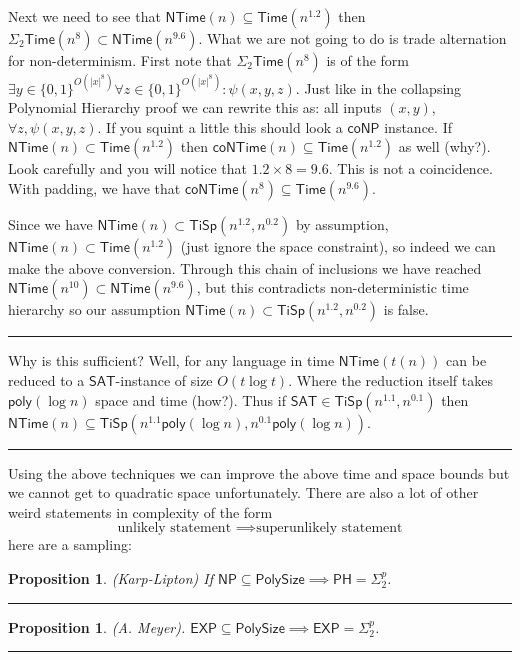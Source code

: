 \documentclass[twoside]{article}
\newtheorem{proposition}[theorem]{Proposition}
\newenvironment{proof}{{\bf Proof:}}{\hfill\rule{2mm}{2mm}}
\def\NP{\mathsf{NP}}
\def\coNP{\mathsf{coNP}}
\def\PH{\mathsf{PH}}
\def\EXP{\mathsf{EXP}}
\def\Time{\mathsf{Time}}
\def\SAT{\mathsf{SAT}}
\def\NTime{\mathsf{NTime}}
\def\TiSp{\mathsf{TiSp}}
\def\poly{\mathsf{poly}}
\def\PolySize{\mathsf{PolySize}}
\begin{document}
\begin{proof}
\begin{proof}
Next we need to see that $\NTime (n) \subseteq \Time (n^{1.2})$ then $\Sigma_2 \Time (n^8) \subset \NTime (n^{9.6})$. What we are not going to do is trade alternation for non-determinism. First note that $\Sigma_2 \Time (n^8)$ is of the form $\exists y \in \{0,1\}^{O(|x|^8)}\forall z \in \{0,1\}^{O(|x|^8)}: \psi (x,y,z)$. Just like in the collapsing Polynomial Hierarchy proof we can rewrite this as: all inputs $(x,y)$, $\forall z, \psi (x,y,z)$. If you squint a little this should look a $\coNP$ instance. If $\NTime (n) \subset \Time (n^{1.2})$ then $\mathsf{coNTime} (n) \subseteq \Time (n^{1.2})$ as well (why?). Look carefully and you will notice that $1.2 \times 8 = 9.6$. This is not a coincidence. With padding, we have that $\mathsf{coNTime} (n^8) \subseteq \Time (n^{9.6})$.  

Since we have $\NTime (n) \subset \TiSp (n^{1.2}, n^{0.2})$ by assumption, $\NTime (n) \subset \Time (n^{1.2})$ (just ignore the space constraint), so indeed we can make the above conversion. Through this chain of inclusions we have reached $\NTime (n^{10}) \subset \NTime (n^{9.6})$, but this contradicts non-deterministic time hierarchy so our assumption $\NTime (n) \subset \TiSp (n^{1.2}, n^{0.2})$ is false.   
\end{proof}

Why is this sufficient? Well, for any language in time $\NTime (t(n))$ can be reduced to a $\SAT$-instance of size $O(t \log t)$. Where the reduction itself takes $\poly (\log n)$ space and time (how?). Thus if $\SAT \in \TiSp(n^{1.1}, n^{0.1})$ then $\NTime (n) \subseteq \TiSp (n^{1.1}\poly (\log n), n^{0.1} \poly (\log n))$.
\end{proof}

Using the above techniques we can improve the above time and space bounds but we cannot get to quadratic space unfortunately. There are also a lot of other weird statements in complexity of the form 
\[\mbox{unlikely statement } \implies \mbox{superunlikely statement}\]
here are a sampling: 

\begin{proposition}
(Karp-Lipton) If $\NP \subseteq \PolySize \implies \PH = \Sigma_2^p$.
\end{proposition}
\begin{proof}

\end{proof}

\begin{proposition}
(A. Meyer). $\EXP \subseteq \PolySize \implies \EXP = \Sigma_2^p$. 
\end{proposition}
\begin{proof}

\end{proof}
\end{document}
